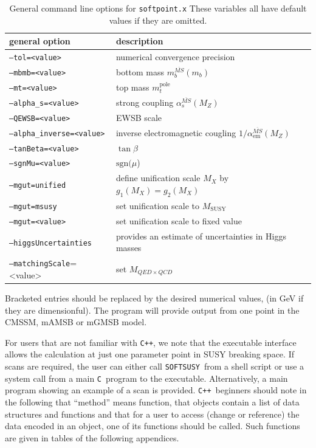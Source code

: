 \documentclass{article}
\def\SOFTSUSY{{\tt SOFTSUSY}}
\def\code#1{\small{\tt #1}\normalsize}
\begin{document}
\begin{table}[tbh]
  \centering
  \begin{tabular}{ll}
    general option & description \\
    \hline
    \code{--tol=<value>} & numerical convergence precision \\
    \code{--mbmb=<value>} & bottom mass $m_b^{\overline{MS}}(m_b)$ \\
    \code{--mt=<value>} & top mass $m_t^\text{pole}$ \\
    \code{--alpha\_s=<value>} & strong coupling $\alpha_s^{\overline{MS}}(M_Z)$ \\
    \code{--QEWSB=<value>} & EWSB scale \\
    \code{--alpha\_inverse=<value>} & inverse electromagnetic cougling
    $1/\alpha^{\overline{MS}}_\text{em}(M_Z)$ \\
    \code{--tanBeta=<value>} & $\tan\beta$ \\
    \code{--sgnMu=<value>} & $\text{sgn}(\mu$) \\
    \code{--mgut=unified} & define unification scale $M_X$ by $g_1(M_X)=g_2(M_X)$ \\
    \code{--mgut=msusy} & set unification scale to $M_\text{SUSY}$ \\
    \code{--mgut=<value>} & set unification scale to fixed value \\
    \code{--higgsUncertainties} & provides an estimate of uncertainties in
      Higgs masses\\
    \code{--matchingScale}=<value> & set $M_{QED \times QCD}$ \\
    \hline
  \end{tabular}
  \caption{General command line options for \code{softpoint.x} These variables
    all have  default values if they are omitted.}
  \label{tab:general-cmd-line-options}
\end{table}
%
Bracketed entries should be replaced by the desired numerical values, (in GeV
if they are dimensionful). The program will provide output from one point in
the CMSSM, mAMSB or mGMSB model. 

For users that are not familiar with \code{C++}, we note that the executable
interface allows the calculation at just one parameter point in SUSY breaking 
space. If scans are required, the user can either call \SOFTSUSY~from a
shell script or use a system call from a main \code{C}~program to the
executable. Alternatively, a main program showing an example of a scan is
provided. \code{C++}~beginners should note in
the following that ``method'' means function, that objects contain a list of
data structures and functions and that for a user to access (change
or reference) the data encoded in an object, one of its functions should be
called. Such functions are given in tables of the following appendices.
\end{document}
